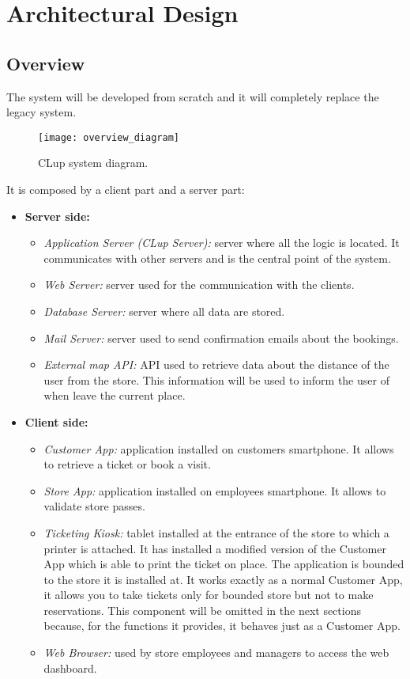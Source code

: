 \chapter{Architectural Design}

\section{Overview}
The system will be developed from scratch and it will completely replace the legacy system. \newline

\vspace{0.8em}
\begin{figure}[H]
	\centering
	\texttt{[image: overview\_diagram]}
	\caption{CLup system diagram.}
\end{figure}

It is composed by a client part and a server part:
\begin{itemize}
	\item \textbf{Server side:}
	\begin{itemize}
		\item \textit{Application Server (CLup Server):} server where all the logic is located. It communicates with other servers and is the central point of the system.
		\item \textit{Web Server:} server used for the communication with the clients.
		\item \textit{Database Server:} server where all data are stored.
		\item \textit{Mail Server:} server used to send confirmation emails about the bookings.
		\item \textit{External map API:} API used to retrieve data about the distance of the user from the store. This information will be used to inform the user of when leave the current place.
	\end{itemize}
	\item \textbf{Client side:}
	\begin{itemize}
		\item \textit{Customer App:} application installed on customers smartphone. It allows to retrieve a ticket or book a visit.
		\item \textit{Store App:} application installed on employees smartphone. It allows to validate store passes.
		\item \textit{Ticketing Kiosk:} tablet installed at the entrance of the store to which a printer is attached. It has installed a modified version of the Customer App which is able to print the ticket on place. The application is bounded to the store it is installed at. It works exactly as a normal Customer App, it allows you to take tickets only for bounded store but not to make reservations.\newline
		This component will be omitted in the next sections because, for the functions it provides, it behaves just as a Customer App.
		\item \textit{Web Browser:} used by store employees and managers to access the web dashboard.
	\end{itemize}
\end{itemize}

